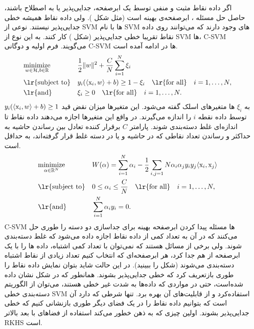 اگر داده نقاط مثبت و منفی توسط یک ابرصفحه، جدایی‌پذیر یا به اصطلاح  باشند، حاصل حل مسئله ، ابرصفحه‌ی بهینه است (مثل شکل ). ولی داده نقاط همیشه خطی جدایی‌پذیر نیستند. نوعی از SVM ها با نام SVM‌ های  وجود دارند که می‌توانند روی داده نقاط تقریبا خطی جدایی‌پذیر (شکل ) کار کنند. به این نوع از SVM ها، C-SVM می‌گویند. فرم اولیه و دوگانی C-SVM ها در ادامه آمده است.
\begin{equation}\label{eq:c-svm-normal-form}
\begin{aligned}
& \underset{w \in \mH, b \in \R}{\text{minimize}} & & \dfrac{1}{2} \|w\|^2 + \dfrac{C}{N} \sum_{i=1}^{N} \xi_i \\
& \text{\lr{subject to}} & & y_i(\langle \mx_i,w \rangle + b) \geq 1 - \xi_i \quad\text{\lr{for all}}\quad i = 1, \ldots ,N, \\
& \text{\lr{and}} & & \xi_i \geq 0\quad\text{\lr{for all}}\quad i = 1, \ldots ,N.
\end{aligned}
\end{equation}
به $\xi_i$ ها متغیرهای اسلک گفته می‌شود. این متغیرها میزان نقض قید $y_i(\langle \mathrm{x}_i,w \rangle + b) \geq 1$ توسط داده نقطه $i$ را اندازه می‌گیرند. در واقع این متغیرها اجازه می‌دهند داده نقاط تا اندازه‌ای غلط دسته‌بندی شوند. پارامتر $C$ برقرار کننده تعادل بین رساندن حاشیه به حداکثر و رساندن تعداد نقاطی که در حاشیه و یا در دسته غلط قرار گرفته‌اند، به حداقل است.
\begin{equation}\label{eq:c-svm-dual-form}
\begin{aligned}
& \underset{\alpha \in \R^N}{\text{minimize}} & & W(\alpha)=\sum_{i=1}^{N}\alpha_i - \dfrac{1}{2} \sum_{i,j=1}{N} \alpha_i \alpha_j y_i y_j \langle \mx_i,\mx_j \rangle \\
& \text{\lr{subject to}} & & 0 \leq \alpha_i \leq \dfrac{C}{N} \quad\text{\lr{for all}}\quad i = 1, \ldots ,N, \\
& \text{\lr{and}} & & \sum_{i=1}^{N} \alpha_i y_i = 0.
\end{aligned}
\end{equation}
C-SVM ها مسئله پیدا کردن ابرصفحه بهینه برای جداسازی دو دسته را طوری حل می‌کنند که در آن به تعداد کمی از داده نقاط اجازه داده می‌شود که غلط دسته‌بندی شوند. ولی برخی از مسائل هستند که نمی‌توان با تعداد کمی اشتباه، داده ها را با یک ابرصفحه از هم جدا کرد، هر ابرصفحه‌ای که انتخاب کنیم تعداد زیادی از نقاط اشتباه دسته‌بندی می‌شوند (شکل  را ببینید). در این حالت شاید بتوان نمایش داده نقاط را طوری بازتعریف کرد که خطی جدایی‌پذیر بشوند.
همانطور که در شکل   نشان داده شده‌است، حتی در مواردی که داده‌ها به شدت غیر خطی هستند، می‌توان از الگوریتم دسته‌بندی خطی  SVM استفاده‌کرد و از قابلیت‌های آن بهره برد. تنها شرطی که دارد آن است که بتوانیم داده نقاط را در یک فضای دیگر طوری بازنشانی کنیم که خطی جدایی‌پذیر بشوند. اولین چیزی که به ذهن خطور می‌کند استفاده از فضاهای با بعد بالاتر RKHS است.


